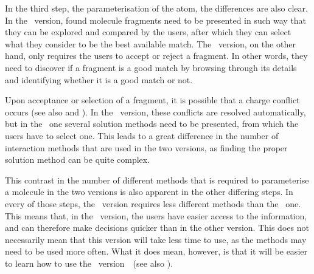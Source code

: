 In the third step, the parameterisation of the atom, the differences are also clear. In the \IDa\ version, found molecule fragments need to be presented in such way that they can be explored and compared by the users, after which they can select what they consider to be the best available match. The \IDb\ version, on the other hand, only requires the users to accept or reject a fragment. In other words, they need to discover if a fragment is a good match by browsing through its details and identifying whether it is a good match or not.

Upon acceptance or selection of a fragment, it is possible that a charge conflict occurs (see also  and ). In the \IDb\ version, these conflicts are resolved automatically, but in the \IDa\ one several solution methods need to be presented, from which the users have to select one. This leads to a great difference in the number of interaction methods that are used in the two versions, as finding the proper solution method can be quite complex.

This contrast in the number of different methods that is required to parameterise a molecule in the two versions is also apparent in the other differing steps. In every of those steps, the \IDb\ version requires less different methods than the \IDa\ one. This means that, in the \IDb\ version, the users have easier access to the information, and can therefore make decisions quicker than in the other version. This does not necessarily mean that this version will take less time to use, as the methods may need to be used more often. What it does mean, however, is that it will be easier to learn how to use the \IDb\ version~\cite{sweller1994cognitive}~(see also ).
